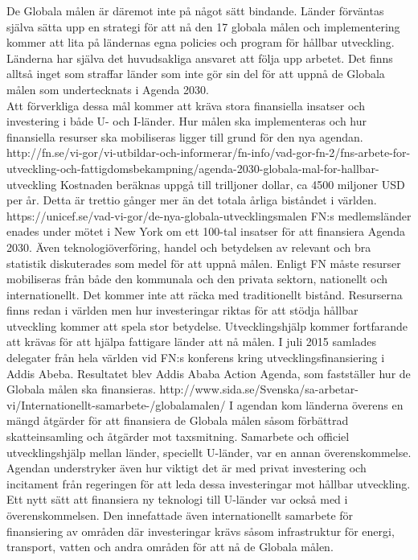 \documentclass{report}
\begin{document}
De Globala målen är däremot inte på något sätt bindande. Länder förväntas själva sätta upp en strategi för att nå den 17 globala målen och implementering kommer att lita på ländernas egna policies och program för hållbar utveckling. Länderna har själva det huvudsakliga ansvaret att följa upp arbetet. Det finns alltså inget som straffar länder som inte gör sin del för att uppnå de Globala målen som undertecknats i Agenda 2030. \cite{web2030agenda}\\

Att förverkliga dessa mål kommer att kräva stora finansiella insatser och  investering i både U- och I-länder. \cite{web2030agenda}
Hur målen ska implementeras och hur finansiella resurser ska mobiliseras ligger till grund för den nya agendan. http://fn.se/vi-gor/vi-utbildar-och-informerar/fn-info/vad-gor-fn-2/fns-arbete-for-utveckling-och-fattigdomsbekampning/agenda-2030-globala-mal-for-hallbar-utveckling 
Kostnaden beräknas uppgå till trilljoner dollar, \cite{web2030agenda} ca 4500 miljoner USD per år. Detta är trettio gånger mer än det totala årliga biståndet i världen.  https://unicef.se/vad-vi-gor/de-nya-globala-utvecklingsmalen FN:s medlemsländer enades under mötet i New York om ett 100-tal insatser för att finansiera Agenda 2030. Även teknologiöverföring, handel och betydelsen av relevant och bra statistik diskuterades som medel för att uppnå målen. \cite{webUNASweden}
Enligt FN måste resurser mobiliseras från både den kommunala och den privata sektorn, nationellt och internationellt. Det kommer inte att räcka med traditionellt bistånd. Resurserna finns redan i världen men hur investeringar riktas för att stödja hållbar utveckling kommer att spela stor betydelse. Utvecklingshjälp kommer fortfarande att krävas för att hjälpa fattigare länder att nå målen. 
\cite{web2030agenda}
I juli 2015 samlades delegater från hela världen vid FN:s konferens kring utvecklingsfinansiering i Addis Abeba. Resultatet blev Addis Ababa Action Agenda, som fastställer hur de Globala målen ska finansieras.  http://www.sida.se/Svenska/sa-arbetar-vi/Internationellt-samarbete-/globalamalen/
I agendan kom länderna överens en mängd åtgärder för att finansiera de Globala målen såsom förbättrad skatteinsamling och åtgärder mot taxsmitning. Samarbete och officiel utvecklingshjälp mellan länder, speciellt U-länder, var en annan överenskommelse. Agendan understryker även hur viktigt det är med privat investering och incitament från regeringen för att leda dessa investeringar mot hållbar utveckling. Ett nytt sätt att finansiera ny teknologi till U-länder var också med i överenskommelsen. Den innefattade även internationellt samarbete för finansiering av områden där investeringar krävs såsom infrastruktur för energi, transport, vatten och andra områden för att nå de Globala målen.  
\cite{webUNDESA}\\
\end{document}
